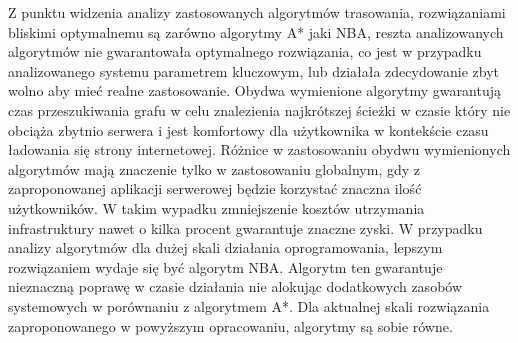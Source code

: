 Z punktu widzenia analizy zastosowanych algorytmów trasowania, rozwiązaniami bliskimi optymalnemu są zarówno algorytmy A* jaki NBA, reszta analizowanych algorytmów nie gwarantowała optymalnego rozwiązania, co jest w przypadku analizowanego systemu parametrem kluczowym, lub działała zdecydowanie zbyt wolno aby mieć realne zastosowanie. Obydwa wymienione algorytmy gwarantują czas przeszukiwania grafu w celu znalezienia najkrótszej ścieżki w czasie który nie obciąża zbytnio serwera i jest komfortowy dla użytkownika w kontekście czasu ładowania się strony internetowej. Różnice w zastosowaniu obydwu wymienionych algorytmów mają znaczenie tylko w zastosowaniu globalnym, gdy z zaproponowanej aplikacji serwerowej będzie korzystać znaczna ilość użytkowników. W takim wypadku zmniejszenie kosztów utrzymania infrastruktury nawet o kilka procent gwarantuje znaczne zyski. W przypadku analizy algorytmów dla dużej skali działania oprogramowania, lepszym rozwiązaniem wydaje się być algorytm NBA. Algorytm ten gwarantuje nieznaczną poprawę w czasie działania nie alokując dodatkowych zasobów systemowych w porównaniu z algorytmem A*. Dla aktualnej skali rozwiązania zaproponowanego w powyższym opracowaniu, algorytmy są sobie równe.
